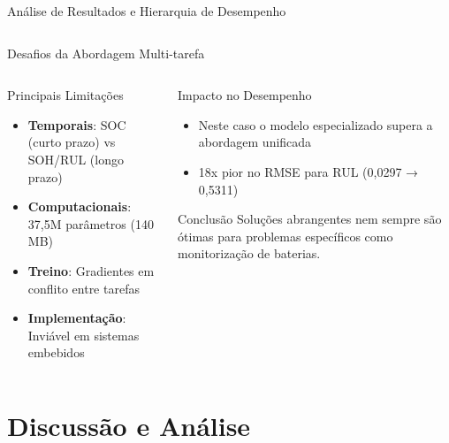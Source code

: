 \documentclass[aspectratio=169,xcolor=dvipsnames]{beamer}
\begin{document}
\begin{frame}{Análise de Resultados e Hierarquia de Desempenho}
\begin{columns}[T]
\begin{column}{0.48\textwidth}
    \end{column}
  \end{columns}
\end{frame}

\begin{frame}{Desafios da Abordagem Multi-tarefa}
  \begin{columns}[T]
    \begin{column}{0.48\textwidth}
      \begin{block}{Principais Limitações}
        \begin{itemize}
          \item \textbf{Temporais}: SOC (curto prazo) vs SOH/RUL (longo prazo)
          \item \textbf{Computacionais}: 37,5M parâmetros (140 MB)
          \item \textbf{Treino}: Gradientes em conflito entre tarefas
          \item \textbf{Implementação}: Inviável em sistemas embebidos
        \end{itemize}
      \end{block}
    \end{column}
    \begin{column}{0.48\textwidth}
      \begin{exampleblock}{Impacto no Desempenho}
        \begin{itemize}
          \item Neste caso o modelo especializado supera a abordagem unificada
          \item 18x pior no RMSE para RUL (0,0297 → 0,5311)
        \end{itemize}
      \end{exampleblock}
      
      \vspace{0.3cm}
      
      \begin{alertblock}{Conclusão}
        \centering
        Soluções abrangentes nem sempre são ótimas para problemas específicos como monitorização de baterias.
      \end{alertblock}
    \end{column}
  \end{columns}
\end{frame}

\section{Discussão e Análise}
\end{document}

